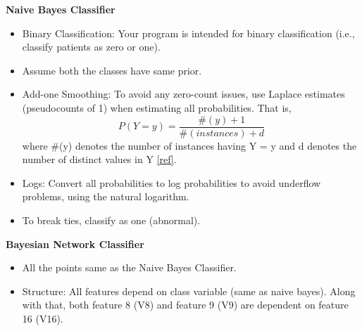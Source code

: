 \documentclass[addpoints,11pt,a4paper]{exam}
\begin{document}
\begin{questions}
\textbf{Naive Bayes Classifier}
\begin{itemize}
    \item Binary Classification: Your program is intended for binary classification (i.e., classify patients as zero or one).
    \item Assume both the classes have same prior.
    \item Add-one Smoothing: To avoid any zero-count issues, use Laplace estimates (pseudocounts of 1) when estimating all probabilities. That is, 
    \begin{equation*}
        P(Y=y) = \frac{\#(y)+1}{\#(instances)+d}
    \end{equation*}
    where \#(y) denotes the number of instances having Y = y and d denotes the number of distinct values in Y  \href{https://en.wikipedia.org/wiki/Additive_smoothing}{[ref]}.
    \item Logs: Convert all probabilities to log probabilities to avoid underflow problems, using the natural logarithm.
    \item To break ties, classify as one (abnormal).
\end{itemize}

\textbf{Bayesian Network Classifier}
\begin{itemize}
    \item All the points same as the Naive Bayes Classifier.
    \item Structure: All features depend on class variable (same as naive bayes).  Along with that, both feature 8 (V8) and feature 9 (V9) are dependent on feature 16 (V16).
\end{itemize}


\end{questions}
\end{document}
